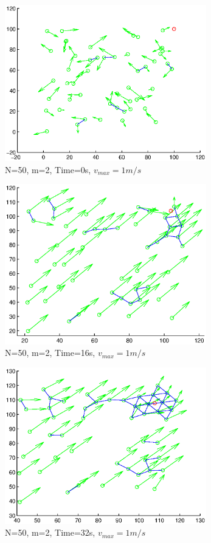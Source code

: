 \documentclass[10pt, conference]{IEEEtran}
\begin{document}
\begin{figure}[!h]
  \begin{center}
    \includegraphics[width=3.45in]{n50m2vmax1t00}
  \end{center}

  \caption{\small N=50, m=2, Time=0s, $v_{max}=1m/s$}
  \label{fig:n50m2vmax1t00}
\end{figure}

\begin{figure}[!h]
  \begin{center}
    \includegraphics[width=3.45in]{n50m2vmax1t16}
  \end{center}

  \caption{\small N=50, m=2, Time=16s, $v_{max}=1m/s$}
  \label{fig:n50m2vmax1t16}
\end{figure}

\begin{figure}[!h]
  \begin{center}
    \includegraphics[width=3.45in]{n50m2vmax1t32}
  \end{center}

  \caption{\small N=50, m=2, Time=32s, $v_{max}=1m/s$}
  \label{fig:n50m2vmax1t32}
\end{figure}
\end{document}
